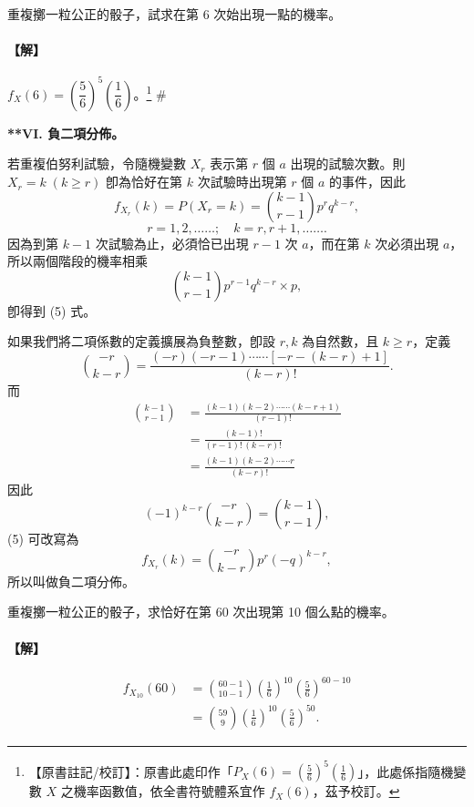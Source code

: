 \medskip
\begin{example}\label{ex:b5s-5-8}
重複擲一粒公正的骰子，試求在第 6 次始出現一點的機率。
\end{example}
\paragraph{【解】}
$f_X(6) = \left(\dfrac{5}{6}\right)^5 \left(\dfrac{1}{6}\right)$。\label{note:b5s-ch5-p151-px6}\footnote{【原書註記/校訂】：原書此處印作「$P_X(6) = \left(\frac{5}{6}\right)^5 \left(\frac{1}{6}\right)$」，此處係指隨機變數 $X$ 之機率函數值，依全書符號體系宜作 $f_X(6)$，茲予校訂。} \hfill $\#$

\medskip
\noindent\textbf{**VI. 負二項分佈。}

若重複伯努利試驗，令隨機變數 $X_r$ 表示第 $r$ 個 $a$ 出現的試驗次數。則 $X_r = k \; (k \ge r)$ 卽為恰好在第 $k$ 次試驗時出現第 $r$ 個 $a$ 的事件，因此
\begin{equation}
f_{X_r}(k) = P(X_r = k) = \binom{k-1}{r-1} p^r q^{k-r}, \label{eq:b5s-ch5-5}
\end{equation}
\[
r = 1, 2, \dots\dots; \quad k = r, r+1, \dots\dots.
\]
因為到第 $k-1$ 次試驗為止，必須恰已出現 $r-1$ 次 $a$，而在第 $k$ 次必須出現 $a$，所以兩個階段的機率相乘
\[
\binom{k-1}{r-1} p^{r-1} q^{k-r} \times p,
\]
卽得到 (5) 式。

如果我們將二項係數的定義擴展為負整數，卽設 $r, k$ 為自然數，且 $k \ge r$，定義
\[
\binom{-r}{k-r} = \frac{(-r)(-r-1)\cdots\cdots [-r-(k-r)+1]}{(k-r)!}.
\]
而
\begin{align*}
\binom{k-1}{r-1} &= \frac{(k-1)(k-2)\cdots\cdots(k-r+1)}{(r-1)!} \\
&= \frac{(k-1)!}{(r-1)!\, (k-r)!} \\
&= \frac{(k-1)(k-2)\cdots\cdots r}{(k-r)!}
\end{align*}
因此
\[
(-1)^{k-r} \binom{-r}{k-r} = \binom{k-1}{r-1},
\]
(5) 可改寫為
\[
f_{X_r}(k) = \binom{-r}{k-r} p^r (-q)^{k-r},
\]
所以叫做負二項分佈。

\medskip
\begin{example}[**]\label{ex:b5s-5-9}
重複擲一粒公正的骰子，求恰好在第 60 次出現第 10 個么點的機率。
\end{example}
\paragraph{【解】}
\begin{align*}
f_{X_{10}}(60) &= \binom{60-1}{10-1} \left(\frac{1}{6}\right)^{10} \left(\frac{5}{6}\right)^{60-10} \\
&= \binom{59}{9} \left(\frac{1}{6}\right)^{10} \left(\frac{5}{6}\right)^{50}. \tag*{\#}
\end{align*}

